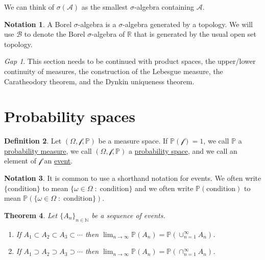 \documentclass[11pt]{article}
\newcommand{\col}[1]{\mathscr{#1}}
\newcommand{\p}{\mathbb{P}}
\newcommand{\bor}{\col{B}}
\newcommand{\defname}[1]{\underline{#1}}
\newcommand{\NN}{\mathbb{N}}
\newcommand{\RR}{\mathbb{R}}
\theoremstyle{theorem}
\newtheorem{theorem}{Theorem}[section]
\theoremstyle{definition}
\newtheorem{definition}[theorem]{Definition}
\newtheorem{notation}[theorem]{Notation}
\theoremstyle{remark}
\theoremstyle{step}
\theoremstyle{gap}
\newtheorem*{gap}{Gap}
\begin{document}
We can think of \(\sigma(\col{A})\) as the smallest \(\sigma\)-algebra containing \(\col{A}\).

\begin{notation}
A Borel \(\sigma\)-algebra is a \(\sigma\)-algebra generated by a topology. We will use \(\bor\) to denote the Borel \(\sigma\)-algebra of \(\RR\) that is generated by the usual open set topology.
\end{notation}

\begin{gap} This section needs to be continued with product spaces, the upper/lower continuity of measures, the construction of the Lebesgue measure, the Caratheodory theorem, and the Dynkin uniqueness theorem.\end{gap}

\section{Probability spaces}

\begin{definition}
Let \((\Omega, \col{f}, \p)\) be a measure space. If \(\p(\col{f}) = 1\), we call \(\p\) a \defname{probability measure}, we call \((\Omega, \col{f}, \p)\) a \defname{probability space}, and we call an element of \(\col{f}\) an \defname{event}.
\end{definition}

\begin{notation}
It is common to use a shorthand notation for events. We often write \(\{\text{condition}\}\) to mean \(\{\omega \in \Omega\;:\;\text{condition}\}\) and we often write \(\p(\text{condition})\) to mean \(\p\left(\{\omega \in \Omega\;:\;\text{condition}\}\right)\).
\end{notation}

\begin{theorem}\label{thm.nestedconvergence}
Let \(\{A_n\}_{n \in \NN}\) be a sequence of events.
\begin{enumerate}
\item
If \(A_1 \subset A_2 \subset A_3 \subset \cdots\) then \(\lim_{n \to \infty} \p(A_n) = \p\left(\cup_{n=1}^\infty A_n\right)\).
\item
If \(A_1 \supset A_2 \supset A_3 \supset \cdots\) then \(\lim_{n \to \infty} \p(A_n) = \p\left(\cap_{n=1}^\infty A_n\right)\).
\end{enumerate}
\end{theorem}
\end{document}
